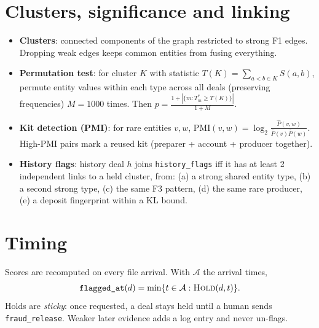 \documentclass[11pt]{article}
\begin{document}
\section{Clusters, significance and linking}
\begin{itemize}
\item \textbf{Clusters}: connected components of the graph restricted to strong F1 edges. Dropping weak edges keeps common entities from fusing everything.
\item \textbf{Permutation test}: for cluster $K$ with statistic $T(K)=\sum_{a<b\in K}S(a,b)$, permute entity values within each type across all deals (preserving frequencies) $M=1000$ times. Then $p=\frac{1+|\{m: T^\ast_m\ge T(K)\}|}{1+M}$.
\item \textbf{Kit detection (PMI)}: for rare entities $v,w$, $\mathrm{PMI}(v,w)=\log_2\frac{\hat P(v,w)}{\hat P(v)\hat P(w)}$. High-PMI pairs mark a reused kit (preparer + account + producer together).
\item \textbf{History flags}: history deal $h$ joins \texttt{history\_flags} iff it has at least 2 independent links to a held cluster, from: (a) a strong shared entity type, (b) a second strong type, (c) the same F3 pattern, (d) the same rare producer, (e) a deposit fingerprint within a KL bound.
\end{itemize}

\section{Timing}
Scores are recomputed on every file arrival. With $\mathcal{A}$ the arrival times,
\begin{equation}
\texttt{flagged\_at}(d)=\min\{t\in\mathcal{A}: \textsc{Hold}(d,t)\}.
\end{equation}
Holds are \emph{sticky}: once requested, a deal stays held until a human sends \texttt{fraud\_release}. Weaker later evidence adds a log entry and never un-flags.
\end{document}
